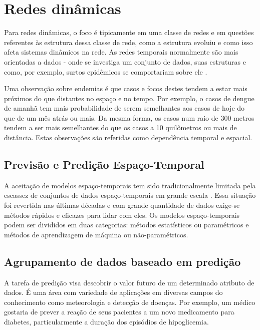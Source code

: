 \chapter{Redes dinâmicas}
 \label{chap:redes-dinamicas}
 
Para redes dinâmicas, o foco é tipicamente em uma classe de redes e em questões referentes às estrutura dessa classe de rede, como a estrutura evoluiu e como isso afeta sistemas dinâmicos na rede. As redes temporais normalmente são mais orientadas a dados - onde se investiga um conjunto de dados, suas estruturas e como, por exemplo, surtos epidêmicos se comportariam sobre ele \cite{holme:colloquium}.

Uma observação sobre endemias é que casos e focos destes tendem a estar mais próximos do que distantes no espaço e no tempo. Por exemplo, o casos de dengue de amanhã tem mais probabilidade de serem semelhantes aos casos de hoje do que de um mês atrás ou mais. Da mesma forma, os casos num raio de 300 metros tendem a ser mais semelhantes do que os casos a 10 quilômetros ou mais de distância. Estas observações são referidas como dependência temporal e espacial.

\section{Previsão e Predição Espaço-Temporal}

A aceitação de modelos espaço-temporais tem sido tradicionalmente limitada pela escassez de conjuntos de dados espaço-temporais em grande escala \cite{Griffith2010}. Essa situação foi revertida nas últimas décadas e com grande quantidade de dados exige-se métodos rápidos e eficazes para lidar com eles. Os modelos espaço-temporais podem ser divididos em duas categorias: métodos estatísticos ou paramétricos e métodos de aprendizagem de máquina ou não-paramétricos.


\section{Agrupamento de dados baseado em predição}

A tarefa de predição visa descobrir o valor futuro de um determinado atributo de dados. É uma área com variedade de aplicações em diversas campos do conhecimento como meteorologia e detecção de doenças. Por exemplo, um médico gostaria de prever a reação de seus pacientes a um novo medicamento para diabetes, particularmente a duração dos episódios de hipoglicemia.

